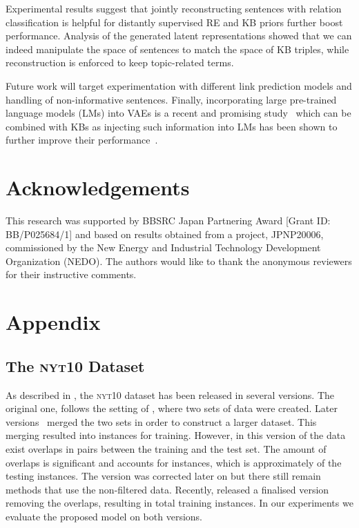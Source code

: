 \documentclass[11pt]{article}
\begin{document}
Experimental results suggest that jointly reconstructing sentences with relation classification is helpful for distantly supervised RE and KB priors further boost performance. Analysis of the generated latent representations showed that we can indeed manipulate the space of sentences to match the space of KB triples, while reconstruction is enforced to keep topic-related terms.   

Future work will target experimentation with different link prediction models and handling of non-informative sentences. 
Finally, incorporating large pre-trained language models (LMs) into \textsc{VAE}s is a recent and promising study~\citep{li-etal-2020-optimus} which can be combined with KBs as injecting such information into LMs has been shown to further improve their performance~\citep{peters-etal-2019-knowledge}. 


\section*{Acknowledgements}
This research was supported by BBSRC Japan Partnering Award [Grant ID: BB/P025684/1] and based on results obtained from a project, JPNP20006, commissioned by the New Energy and Industrial Technology Development Organization (NEDO). The authors would like to thank the anonymous reviewers for their instructive comments.






\appendix

\section{Appendix}

\subsection{The \textsc{nyt10} Dataset}
\label{app:info_nyt}
As described in \citet{bai2019structured}, the \textsc{nyt10} dataset has been released in several versions. The original one, follows the setting of \citet{riedel2010modeling}, where two sets of data were created. Later versions~\citep{lin2016neural} merged the two sets in order to construct a larger dataset. This merging resulted into  instances for training. However, in this version of the data exist overlaps in pairs between the training and the test set.
The amount of overlaps is significant and accounts for  instances, which is approximately  of the testing instances.
The version was corrected later on but there still remain methods that use the non-filtered data.
Recently, \citet{han2019opennre} released a finalised version removing the overlaps, resulting in  total training instances.
In our experiments we evaluate the proposed model on both versions.
\end{document}
